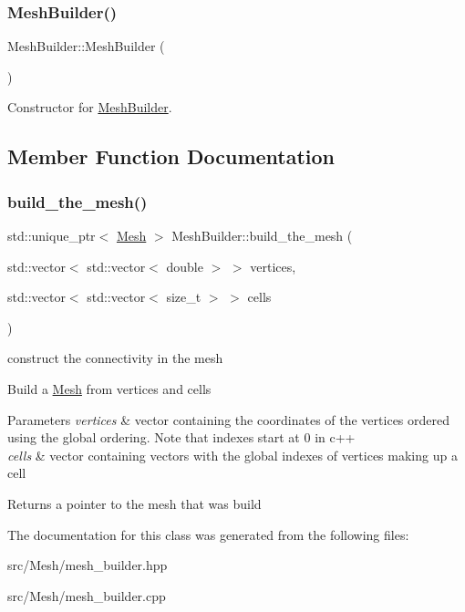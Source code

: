 \subsubsection{\texorpdfstring{Mesh\+Builder()}{MeshBuilder()}}
{\footnotesize\ttfamily Mesh\+Builder\+::\+Mesh\+Builder (\begin{DoxyParamCaption}{ }\end{DoxyParamCaption})}

Constructor for \hyperlink{classHArDCore2D_1_1MeshBuilder}{Mesh\+Builder}. 

\subsection{Member Function Documentation}
\mbox{\label{classHArDCore2D_1_1MeshBuilder_a0ef4a78ac64d1bcb6380317ea866758d}} 
\subsubsection{\texorpdfstring{build\+\_\+the\+\_\+mesh()}{build\_the\_mesh()}}
{\footnotesize\ttfamily std\+::unique\+\_\+ptr$<$ \hyperlink{classHArDCore2D_1_1Mesh}{Mesh} $>$ Mesh\+Builder\+::build\+\_\+the\+\_\+mesh (\begin{DoxyParamCaption}\item[{std\+::vector$<$ std\+::vector$<$ double $>$ $>$}]{vertices,  }\item[{std\+::vector$<$ std\+::vector$<$ size\+\_\+t $>$ $>$}]{cells }\end{DoxyParamCaption})}



construct the connectivity in the mesh 

Build a \hyperlink{classHArDCore2D_1_1Mesh}{Mesh} from vertices and cells


\begin{DoxyParams}{Parameters}
{\em vertices} & vector containing the coordinates of the vertices ordered using the global ordering. Note that indexes start at 0 in c++ \\
\hline
{\em cells} & vector containing vectors with the global indexes of vertices making up a cell\\
\hline
\end{DoxyParams}
\begin{DoxyReturn}{Returns}
a pointer to the mesh that was build 
\end{DoxyReturn}


The documentation for this class was generated from the following files\+:\begin{DoxyCompactItemize}
\item 
src/\+Mesh/mesh\+\_\+builder.\+hpp\item 
src/\+Mesh/mesh\+\_\+builder.\+cpp\end{DoxyCompactItemize}
